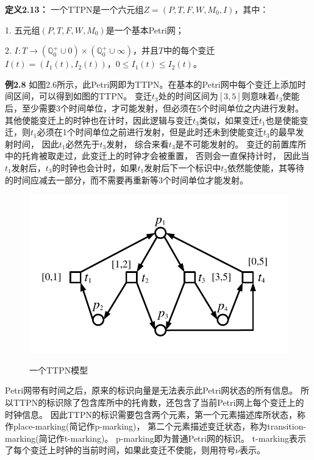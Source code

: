     \textbf{定义2.13}\cite{2013Time}\textbf{：}
    一个TTPN是一个六元组$Z=(P,T,F,W,M_{0},I)$，其中：

    1. 五元组$(P,T,F,W,M_{0})$是一个基本Petri网；

    2. $I:T \rightarrow (\mathbb{Q}_{0}^{+} \cup 0)\times (\mathbb{Q}_{0}^{+} \cup {\infty})$，并且$T$中的每个变迁$I(t)=(I_{1}(t),I_{2}(t))$，$0 \leq I_{1}(t) \leq I_{2}(t)$。

    \textbf{例2.8}\hspace{0.5em}
    如图2.6所示，此Petri网即为TTPN。在基本的Petri网中每个变迁上添加时间区间，可以得到如图的TTPN。
    变迁$t_{3}$处的时间区间为$[3,5]$则意味着$t_{3}$使能后，至少需要3个时间单位，才可能发射，但必须在5个时间单位之内进行发射。
    其他使能变迁上的时钟也在计时，因此逻辑与变迁$t_{3}$类似，如果变迁$t_1$也是使能变迁，则$t_1$必须在1个时间单位之前进行发射，但是此时还未到使能变迁$t_{3}$的最早发射时间，
    因此$t_1$必然先于$t_{3}$发射，
    综合来看$t_{3}$是不可能发射的。
    变迁的前置库所中的托肯被取走过，此变迁上的时钟才会被重置，
    否则会一直保持计时，
    因此当$t_{1}$发射后，$t_{3}$的时钟也会计时，如果$t_{1}$发射后下一个标识中$t_{3}$依然能使能，其等待的时间应减去一部分，而不需要再重新等3个时间单位才能发射。

    \begin{figure}[H]
        \centering
        \includegraphics[scale=0.65,angle=0]{figures/figure3-1.pdf}\\
        \caption{一个TTPN模型}
    \end{figure}

    Petri网带有时间之后，原来的标识向量是无法表示此Petri网状态的所有信息。
    所以TTPN的标识除了包含库所中的托肯数，还包含了当前Petri网上每个变迁上的时钟信息。
    因此TTPN的标识需要包含两个元素，第一个元素描述库所状态，称作place-marking(简记作p-marking)，
    第二个元素描述变迁状态，称为transition-marking(简记作t-marking)。
    p-marking即为普通Petri网的标识。
    t-marking表示了每个变迁上时钟的当前时间，如果此变迁不使能，则用符号$\nu$表示。

